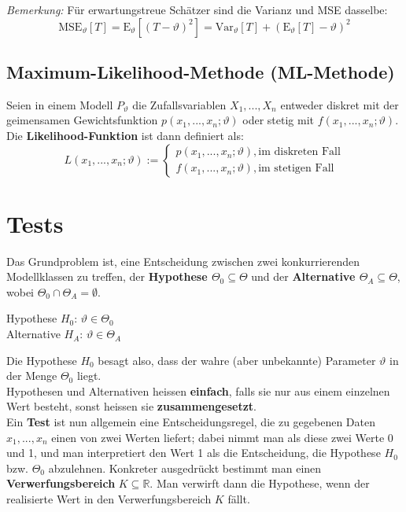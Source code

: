 \documentclass[11pt]{article}
\newcommand{\E}{\text{E}}
\newcommand{\Var}{\text{Var}}
\newcommand{\MSE}{\text{MSE}}
\begin{document}
\emph{Bemerkung:} F{\"u}r erwartungstreue Sch{\"a}tzer sind die Varianz und MSE dasselbe:
\begin{equation*}
	\MSE_\vartheta[T] = \E_\vartheta[(T-\vartheta)^2] = \Var_\vartheta[T] + (\E_\vartheta[T] - \vartheta)^2
\end{equation*}

\subsection{Maximum-Likelihood-Methode (ML-Methode)}

Seien in einem Modell $P_\vartheta$ die Zufallsvariablen $X_1,...,X_n$ entweder diskret mit der geimensamen Gewichtsfunktion $p(x_1,...,x_n;\vartheta)$ oder stetig mit $f(x_1,...,x_n;\vartheta)$. Die \textbf{Likelihood-Funktion} ist dann definiert als:
\begin{equation*}
	L(x_1,...,x_n;\vartheta) := \begin{cases}
		p(x_1,...,x_n; \vartheta), \text{im diskreten Fall} \\
		f(x_1,...,x_n; \vartheta), \text{im stetigen Fall}
	\end{cases}
\end{equation*}

\section{Tests}

Das Grundproblem ist, eine Entscheidung zwischen zwei konkurrierenden Modellklassen zu treffen, der \textbf{Hypothese $\Theta_0 \subseteq \Theta$} und der \textbf{Alternative $\Theta_A \subseteq \Theta$}, wobei $\Theta_0 \cap \Theta_A = \emptyset$.

\begin{center}
	Hypothese $H_0$: $\vartheta \in \Theta_0$ \\
	Alternative $H_A$: $\vartheta \in \Theta_A$
\end{center}

Die Hypothese $H_0$ besagt also, dass der wahre (aber unbekannte) Parameter $\vartheta$ in der Menge $\Theta_0$ liegt. \\
Hypothesen und Alternativen heissen \textbf{einfach}, falls sie nur aus einem einzelnen Wert besteht, sonst heissen sie \textbf{zusammengesetzt}. \\

Ein \textbf{Test} ist nun allgemein eine Entscheidungsregel, die zu gegebenen Daten $x_1,...,x_n$ einen von zwei Werten liefert; dabei nimmt man als diese zwei Werte 0 und 1, und man interpretiert den Wert 1 als die Entscheidung, die Hypothese $H_0$ bzw. $\Theta_0$ abzulehnen. Konkreter ausgedr{\"u}ckt bestimmt man einen \textbf{Verwerfungsbereich} $K \subseteq \mathbb{R}$. Man verwirft dann die Hypothese, wenn der realisierte Wert in den Verwerfungsbereich $K$ f{\"a}llt. \\
\end{document}
